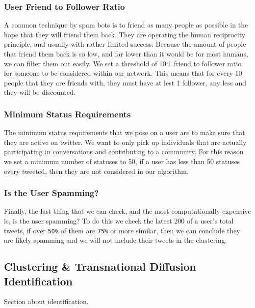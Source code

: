 \subsubsection{User Friend to Follower Ratio}
A common technique by spam bots is to friend as many people as possible in the hope that they will friend them back. They are operating the human reciprocity principle, and usually with rather limited success. Because the amount of people that friend them back is so low, and far lower than it would be for most humans, we can filter them out easily. We set a threshold of 10:1 friend to follower ratio for someone to be considered within our network. This means that for every 10 people that they are friends with, they must have at lest 1 follower, any less and they will be discounted.

\subsubsection{Minimum Status Requirements}
The minimum status requirements that we pose on a user are to make sure that they are active on twitter. We want to only pick up individuals that are actually participating in conversations and contributing to a community. For this reason we set a minimum number of statuses to 50, if a user has less than 50 statuses every tweeted, then they are not considered in our algorithm.

\subsubsection{Is the User Spamming?}
Finally, the last thing that we can check, and the most computationally expensive is, is the user spamming? To do this we check the latest 200 of a user's total tweets, if over \verb|50%| of them are \verb|75%| or more similar, then we can conclude they are likely spamming and we will not include their tweets in the clustering.

\subsection{Clustering \& Transnational Diffusion Identification}
Section about identification.
